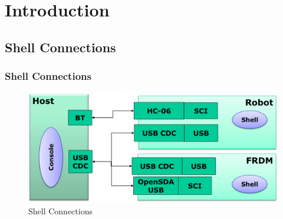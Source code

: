 \section{Introduction}
\subsection*{Shell Connections}
\begin{frame}
    \frametitle{Shell Connections}
    \begin{figure}
       \includegraphics[height=0.5\textheight]{fig/shell.png}
       \caption{Shell Connections}
    \end{figure}
\end{frame}